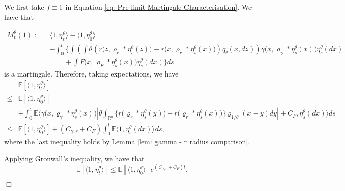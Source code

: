 \documentclass[12pt]{article}
\newenvironment {proof}{{\noindent\bf Proof }}{\hfill $\Box$ \medskip}
\begin{document}
\begin{proof}
We first take $f \equiv 1$ in Equation \eqref{eq: Pre-limit Martingale Characterisation}. We have that 

\begin{equation}
    \label{eq: Total Mass Martingale Characterisation}
\begin{aligned}
     M^{\theta}_t(1):=&  \langle 1,\eta^{\theta}_t \rangle
        -\langle 1,\eta^{\theta}_0 \rangle\\
 &-  \int_{0}^{t}\bigg\{   \int\left(   \int \theta
 \left(
        r\big(z,\varrho_{r}*\eta^{\theta}_{s}(z)\big)
            -r\big(x,\varrho_{r}*\eta^{\theta}_{s}(x)\big)
            \right)
                    q_\theta(x,dz)\right)
                            \gamma\big(x,\varrho_{\gamma}*\eta^{\theta}_{s}(x)\big)
                            \eta^{\theta}_{s}(dx)\\
& \qquad +\int F\big(x,\varrho_{F}*\eta^{\theta}_{s}(x)\big)
\eta^{\theta}_{s}(dx)\bigg\} ds
\end{aligned}    
\end{equation}
is a martingale.
Therefore, taking expectations, we have
\begin{equation}\label{eq: Total mass control generalised}
\begin{aligned}
&\mathbb{E}[\langle 1 ,\eta^{\theta}_{t}\rangle] \\
\leq &  \mathbb{E}[\langle 1 ,\eta^{\theta}_{0}\rangle] \\
&+ \int_{0}^{t}\mathbb{E}\bigg\langle
        \gamma\big(x,\varrho_{\gamma}*\eta^{\theta}_{s}(x)\big)
            \left| \theta \int_{\mathbb{R}^n}
                    \big\{r\big(\varrho_{r}*\eta^{\theta}_s(y)\big)-r\big(\varrho_{r}*\eta^{\theta}_s(x)\big)\big\}
                    \varrho_{1/\theta}(x-y)dy\right| + C_F 
                            ,\eta^{\theta}_s(dx)  \bigg\rangle ds\\
\leq &  \mathbb{E}[\langle 1 ,\eta^{\theta}_{0}\rangle] + (C_{\gamma,r} + C_F)\int_{0}^{t}\mathbb{E} \langle 1  ,\eta^{\theta}_s(dx) \rangle ds,
\end{aligned}
\end{equation}
where the last inequality holds by Lemma \ref{lem: gamma - r radius comparison}.

Applying Gronwall's inequality, we have that 
\begin{equation}
 \mathbb{E}[\langle 1 ,\eta^{\theta}_{t}\rangle] \leq \mathbb{E}[\langle 1 ,\eta^{\theta}_{0}\rangle]e^{(C_{\gamma,r}+C_F)t}.   
\end{equation}


\end{proof}
\end{document}
